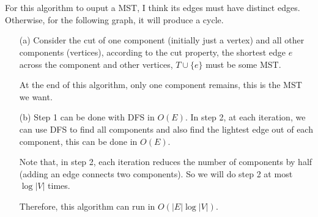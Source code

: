 \documentclass[twoside]{homework}
\begin{document}
\section{}
For this algorithm to ouput a MST, I think its edges must have distinct edges. Otherwise, for the following graph, it will produce a cycle.


\begin{enumerate}
	\item [(a)] Consider the cut of one component (initially just a vertex) and all other components (vertices), according to the cut property, the shortest edge $e$ across the component and other vertices, $T\cup \{e\}$ must be some MST.

	At the end of this algorithm, only one component remains, this is the MST we want.
	\item [(b)]
	Step 1 can be done with DFS in $O(E)$. In step 2, at each iteration, we can use DFS to find all components and also find the lightest edge out of each component, this can be done in $O(E)$.

	Note that, in step 2, each iteration reduces the number of components by half (adding an edge connects two components). So we will do step 2 at most $\log |V|$ times.

	Therefore, this algorithm can run in $O(|E|\log |V|)$.
\end{enumerate}
\end{document}
